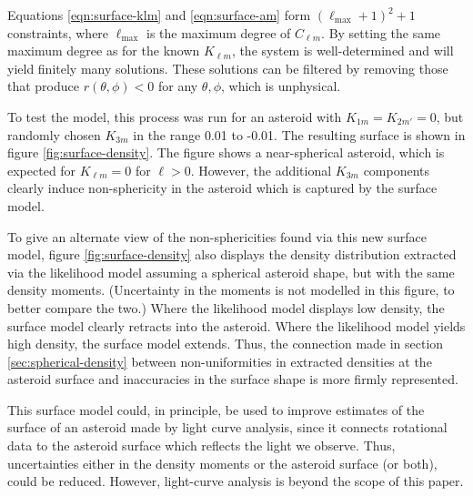 Equations \ref{eqn:surface-klm} and \ref{eqn:surface-am} form $(\ell_\text{max} + 1)^2 + 1$ constraints, where $\ell_\text{max}$ is the maximum degree of $C_{\ell m}$. By setting the same maximum degree as for the known $K_{\ell m}$, the system is well-determined and will yield finitely many solutions. These solutions can be filtered by removing those that produce $r(\theta, \phi) < 0$ for any $\theta, \phi$, which is unphysical.

To test the model, this process was run for an asteroid with $K_{1m}=K_{2m'}=0$, but randomly chosen $K_{3m}$ in the range 0.01 to -0.01. The resulting surface is shown in figure \ref{fig:surface-density}. The figure shows a near-spherical asteroid, which is expected for $K_{\ell m} = 0$ for $\ell > 0$. However, the additional $K_{3m}$ components clearly induce non-sphericity in the asteroid which is captured by the surface model.

To give an alternate view of the non-sphericities found via this new surface model, figure \ref{fig:surface-density} also displays the density distribution extracted via the likelihood model assuming a spherical asteroid shape, but with the same density moments. (Uncertainty in the moments is not modelled in this figure, to better compare the two.) Where the likelihood model displays low density, the surface model clearly retracts into the asteroid. Where the likelihood model yields high density, the surface model extends. Thus, the connection made in section \ref{sec:spherical-density} between non-uniformities in extracted densities at the asteroid surface and inaccuracies in the surface shape is more firmly represented.

This surface model could, in principle, be used to improve estimates of the surface of an asteroid made by light curve analysis, since it connects rotational data to the asteroid surface which reflects the light we observe. Thus, uncertainties either in the density moments or the asteroid surface (or both), could be reduced. However, light-curve analysis is beyond the scope of this paper.

